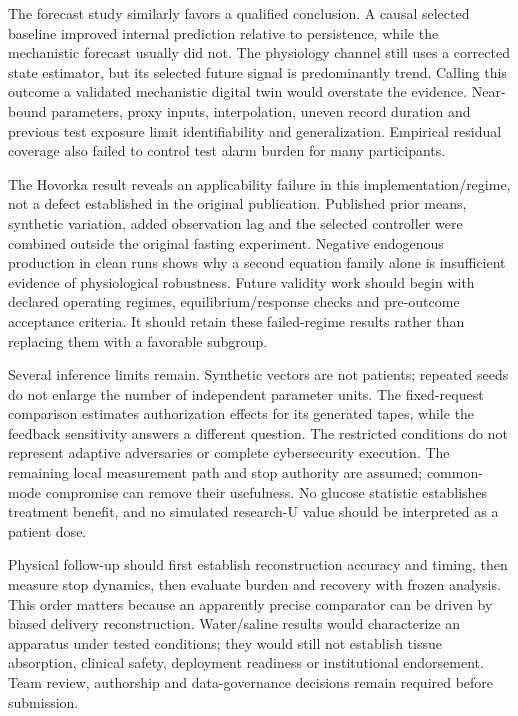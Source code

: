 \documentclass[journal,10pt,letterpaper]{IEEEtran}
\begin{document}
The forecast study similarly favors a qualified conclusion. A causal
selected baseline improved internal prediction relative to persistence,
while the mechanistic forecast usually did not. The physiology channel
still uses a corrected state estimator, but its selected future signal
is predominantly trend. Calling this outcome a validated mechanistic
digital twin would overstate the evidence. Near-bound parameters, proxy
inputs, interpolation, uneven record duration and previous test exposure
limit identifiability and generalization. Empirical residual coverage
also failed to control test alarm burden for many participants.

The Hovorka result reveals an applicability failure in this
implementation/regime, not a defect established in the original
publication. Published prior means, synthetic variation, added
observation lag and the selected controller were combined outside the
original fasting experiment. Negative endogenous production in clean
runs shows why a second equation family alone is insufficient evidence
of physiological robustness. Future validity work should begin with
declared operating regimes, equilibrium/response checks and pre-outcome
acceptance criteria. It should retain these failed-regime results rather
than replacing them with a favorable subgroup.

Several inference limits remain. Synthetic vectors are not patients;
repeated seeds do not enlarge the number of independent parameter units.
The fixed-request comparison estimates authorization effects for its
generated tapes, while the feedback sensitivity answers a different
question. The restricted conditions do not represent adaptive
adversaries or complete cybersecurity execution. The remaining local
measurement path and stop authority are assumed; common-mode compromise
can remove their usefulness. No glucose statistic establishes treatment
benefit, and no simulated research-U value should be interpreted as a
patient dose.

Physical follow-up should first establish reconstruction accuracy and
timing, then measure stop dynamics, then evaluate burden and recovery
with frozen analysis. This order matters because an apparently precise
comparator can be driven by biased delivery reconstruction. Water/saline
results would characterize an apparatus under tested conditions; they
would still not establish tissue absorption, clinical safety, deployment
readiness or institutional endorsement. Team review, authorship and
data-governance decisions remain required before submission.
\end{document}
